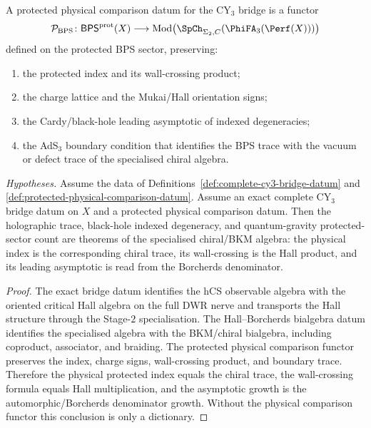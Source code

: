 \begin{definition}
\label{def:protected-physical-comparison-datum}
A protected physical comparison datum for the CY$_3$ bridge is a
functor
\[
 \mathcal P_{\mathrm{BPS}}\colon
 \mathsf{BPS}^{\mathrm{prot}}(X)
 \longrightarrow
 \mathrm{Mod}\bigl(\SpCh_{\Sigma_2,C}(\PhiFA_3(\Perf(X)))\bigr)
\]
defined on the protected BPS sector, preserving:
\begin{enumerate}
\item the protected index and its wall-crossing product;
\item the charge lattice and the Mukai/Hall orientation signs;
\item the Cardy/black-hole leading asymptotic of indexed degeneracies;
\item the AdS$_3$ boundary condition that identifies the BPS trace with
the vacuum or defect trace of the specialised chiral algebra.
\end{enumerate}
\end{definition}

\begin{corollary}
\label{cor:physics-after-comparison}
\noindent\emph{Hypotheses.} Assume the data of
Definitions~\ref{def:complete-cy3-bridge-datum} and
\ref{def:protected-physical-comparison-datum}.
Assume an exact complete CY$_3$ bridge datum on $X$ and a protected
physical comparison datum. Then the holographic trace, black-hole
indexed degeneracy, and quantum-gravity protected-sector count are
theorems of the specialised chiral/BKM algebra: the physical index is
the corresponding chiral trace, its wall-crossing is the Hall product,
and its leading asymptotic is read from the Borcherds denominator.
\end{corollary}

\begin{proof}
The exact bridge datum identifies the hCS observable algebra with the
oriented critical Hall algebra on the full DWR nerve and transports the
Hall structure through the Stage-$2$ specialisation. The
Hall--Borcherds bialgebra datum identifies the specialised algebra with
the BKM/chiral bialgebra, including coproduct, associator, and
braiding. The protected physical comparison functor preserves the
index, charge signs, wall-crossing product, and boundary trace.
Therefore the physical protected index equals the chiral trace, the
wall-crossing formula equals Hall multiplication, and the asymptotic
growth is the automorphic/Borcherds denominator growth. Without the
physical comparison functor this conclusion is only a dictionary.
\end{proof}

